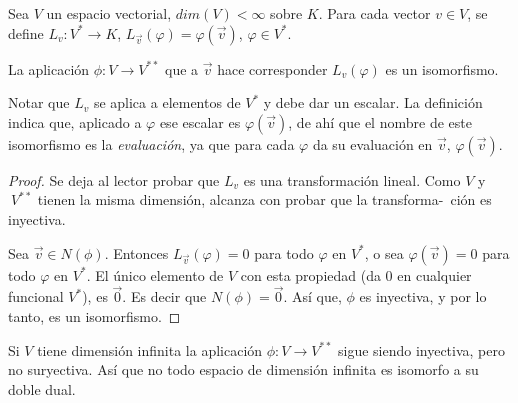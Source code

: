 \bigskip










\begin{theorem}

Sea $V$ un espacio vectorial,  $dim(V)<\infty$ sobre $K$. Para cada vector $v \in V$, se define
$L_v: V^* \rightarrow K$, $L_{\vec{v}}(\varphi)=\varphi(\vec{v})$, $\varphi \in V^*$.


\bigskip

La aplicación 
$\phi:V \rightarrow V^{**}$ que a $\vec{v}$ hace corresponder $L_v(\varphi)$ es un isomorfismo.


\bigskip


Notar que   $L_v$ se aplica a elementos de $V^*$ y debe dar un escalar. La definición indica que, aplicado a $\varphi$ ese escalar es $\varphi(\vec{v})$, de ahí que el nombre de este isomorfismo es la \textit{evaluación}, ya que para cada $\varphi$ da su evaluación en $\vec{v}$,  $\varphi(\vec{v})$.
\begin{proof}
Se deja al lector probar que $L_v$ es una transformación lineal. Como $V$ y $~V^{**}$ tienen la misma dimensión, alcanza con probar que la transforma-\ ción es inyectiva.

\bigskip

Sea $\vec{v} \in N(\phi)$. Entonces $L_{\vec{v}}(\varphi)=0$ para todo $\varphi$ en  $V^*$, o sea 
$\varphi(\vec{v})=0$  para todo $\varphi$ en  $V^*$. El único elemento de $V$ con esta propiedad (da $0$ en cualquier funcional $V^*$), es $\vec{0}$. Es decir que $N(\phi)= \vec{0}$. Así que, $\phi$ es inyectiva, y por lo tanto, es un isomorfismo.


\end{proof}
\end{theorem}


\begin{remark}
Si $V$ tiene dimensión infinita la aplicación $\phi:V \rightarrow V^{**}$ sigue siendo inyectiva, pero no suryectiva. Así que no todo espacio de dimensión infinita es isomorfo a su doble dual.
\end{remark}


